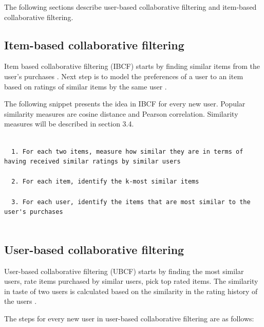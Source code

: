 \documentclass[12pt,a4paper,english
]{tutthesis}
\begin{document}
The following sections describe user-based collaborative filtering and item-based collaborative filtering.

\subsection{Item-based collaborative filtering}

Item based collaborative filtering (IBCF) starts by finding similar items from the user's purchases \cite{gorakala15}. Next step is to model the preferences of a user to an item based on ratings of similar items by the same user \cite{ricci11}.

The following snippet presents the idea in IBCF for every new user. Popular similarity measures are cosine distance and Pearson correlation. Similarity measures will be described in section 3.4.

\lstset{
	columns=flexible,
	frame=single,
	breaklines=true
}

\begin{lstlisting}[caption=Item-Based Collaborative Filtering algorithm \cite{gorakala15}]

  1. For each two items, measure how similar they are in terms of having received similar ratings by similar users

  2. For each item, identify the k-most similar items

  3. For each user, identify the items that are most similar to the user's purchases
  

\end{lstlisting}

\subsection{User-based collaborative filtering}

User-based collaborative filtering (UBCF) starts by finding the most similar users, rate items purchased by similar users, pick top rated items. The similarity in taste of two users is calculated based on the similarity in the rating history of the users \cite{ricci11}.

The steps for every new user in user-based collaborative filtering are as follows:

\lstset{
	columns=flexible,
	frame=single,
	breaklines=true
}
\end{document}
